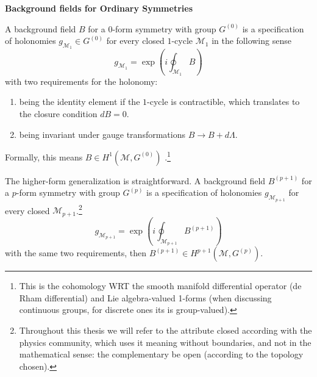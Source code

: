 \documentclass[aps,preprint,nofootinbib,preprintnumbers,eqsecnum,superscriptaddress]{revtex4}
\numberwithin{equation}{section}
\begin{document}
  \begin{tcolorbox}
      {\bf Background fields for Ordinary Symmetries}

      A background field $B$ for a $0$-form symmetry with group $G^{(0)}$ is a specification of holonomies $g_{\mathcal{M}_1} \in G^{(0)}$ for every closed $1$-cycle $\mathcal{M}_1$ in the following sense
      \begin{equation}
        g_{\mathcal{M}_1} = \exp \left( i \oint_{\mathcal{M}_1} B \right)
      \end{equation}
      with two requirements for the holonomy: 
      
      \begin{enumerate}[\itshape i)]
          \item being the identity element if the $1$-cycle is contractible, which translates to the closure condition $dB=0$.

          \item being invariant under gauge transformations $B \to B + d\Lambda$.
      \end{enumerate}
      Formally, this means $B \in H^1(\mathcal{M}, G^{(0)})$ \cite{schafernameki2023ictplecturesnoninvertiblegeneralized}.\footnote{This is the cohomology WRT the smooth manifold differential operator (de Rham differential) and Lie algebra-valued 1-forms (when discussing continuous groups, for discrete ones its is group-valued).}
  \end{tcolorbox}

  The higher-form generalization is straightforward. A background field $B^{(p+1)}$ for a $p$-form symmetry with group $G^{(p)}$ is a specification of holonomies $g_{\mathcal{M}_{p+1}}$ for every closed $\mathcal{M}_{p+1}$.\footnote{Throughout this thesis we will refer to the attribute closed according with the physics community, which uses it meaning without boundaries, and not in the mathematical sense: the complementary be open (according to the topology chosen).}
  \begin{equation}
    g_{\mathcal{M}_{p+1}} = \exp \left( i \oint_{\mathcal{M}_{p+1}} B^{(p+1)} \right)
\end{equation}
with the same two requirements, then $B^{(p+1)} \in H^{p+1}(\mathcal{M}, G^{(p)})$.
\end{document}
